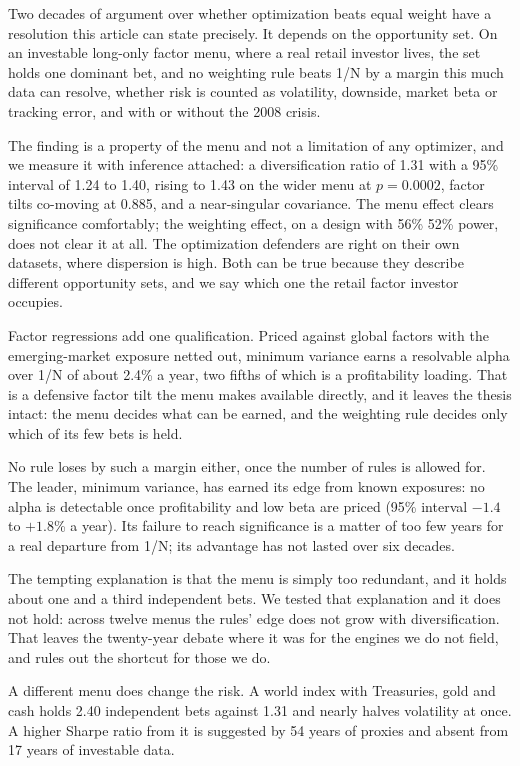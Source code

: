 \documentclass[12pt,letterpaper]{article}
\newcommand{\quita}[1]{{\color{quitarc}#1}}
\newcommand{\nuevo}[1]{{\color{nuevoc}#1}}
\newenvironment{quitado}{\par\color{quitarc}}{\par}
\newenvironment{nuevotexto}{\par\color{nuevoc}}{\par}
\begin{document}
\quita{Two decades of argument over whether optimization beats equal weight have a
resolution this article can state precisely. It depends on the opportunity set.} On
an investable long-only factor menu, where a real retail investor lives, the set
holds one dominant bet, and no weighting rule beats 1/N by a margin this much data
can resolve\nuevo{, whether risk is counted as volatility, downside, market beta or tracking
error, and with or without the 2008 crisis}. \begin{quitado}
The finding is a property of the menu and not a limitation of any
optimizer, and we measure it with inference attached: a diversification ratio of
1.31 with a 95\% interval of 1.24 to 1.40, rising to 1.43 on the wider menu at
$p = 0.0002$, factor tilts co-moving at 0.885, and a near-singular covariance. The
menu effect clears significance comfortably; the weighting effect, on a design
with \quita{56\%} \nuevo{52\%} power, does not clear it at all. The optimization defenders are right on
their own datasets, where dispersion is high. Both can be true because they
describe different opportunity sets, and we say which one the retail factor
investor occupies.

\nuevo{Factor regressions add one qualification. Priced against global factors with the
emerging-market exposure netted out, minimum variance earns a resolvable alpha over 1/N of about
2.4\% a year, two fifths of which is a profitability loading. That is a defensive factor tilt the
menu makes available directly, and it leaves the thesis intact: the menu decides what can be
earned, and the weighting rule decides only which of its few bets is held.}
\end{quitado}
\begin{nuevotexto}
No rule loses by such a margin either, once the number of rules is allowed for. The leader,
minimum variance, has earned its edge from known exposures: no alpha is detectable once profitability
and low beta are priced (95\% interval $-1.4$ to $+1.8$\% a year). Its failure to reach significance is a
matter of too few years for a real departure from 1/N; its advantage has not lasted over six decades.

The tempting explanation is that the menu is simply too redundant, and it holds about one
and a third independent bets. We tested that explanation and it does not hold: across twelve menus the
rules' edge does not grow with diversification. That leaves the twenty-year debate where it was for the
engines we do not field, and rules out the shortcut for those we do.

A different menu does change the risk. A world index with Treasuries, gold and cash holds 2.40 independent
bets against 1.31 and nearly halves volatility at once. A higher Sharpe ratio from it is suggested by 54
years of proxies and absent from 17 years of investable data.
\end{nuevotexto}
\end{document}
